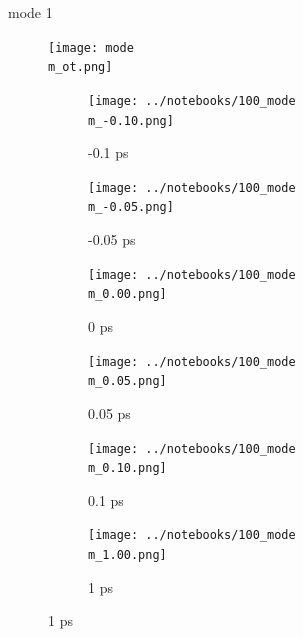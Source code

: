 \documentclass{beamer}
\newcommand\w{0.32}
\begin{document}
\renewcommand\m{1}
\begin{frame}{mode \m}
	\vspace{\vh mm}
	\begin{figure}
		\centering
		\texttt{[image: mode\\m\_ot.png]}
	\end{figure}
	\begin{figure}
		\centering
		\begin{subfigure}[b]{\w\textwidth}
			\centering
			\texttt{[image: ../notebooks/100\_mode\\m\_-0.10.png]}
			\caption{-0.1 ps}
		\end{subfigure}
		\begin{subfigure}[b]{\w\textwidth}
			\centering
			\texttt{[image: ../notebooks/100\_mode\\m\_-0.05.png]}
			\caption{-0.05 ps}
		\end{subfigure}
		\begin{subfigure}[b]{\w\textwidth}
			\centering
			\texttt{[image: ../notebooks/100\_mode\\m\_0.00.png]}
			\caption{0 ps}
		\end{subfigure}
		\begin{subfigure}[b]{\w\textwidth}
			\centering
			\texttt{[image: ../notebooks/100\_mode\\m\_0.05.png]}
			\caption{0.05 ps}
		\end{subfigure}
		\begin{subfigure}[b]{\w\textwidth}
			\centering
			\texttt{[image: ../notebooks/100\_mode\\m\_0.10.png]}
			\caption{0.1 ps}
		\end{subfigure}
		\begin{subfigure}[b]{\w\textwidth}
			\centering
			\texttt{[image: ../notebooks/100\_mode\\m\_1.00.png]}
			\caption{1 ps}
		\end{subfigure}
	\end{figure}
\end{frame}

\renewcommand\m{2}
\end{document}
